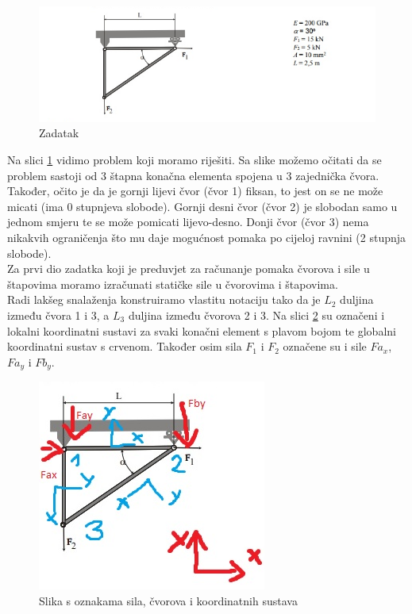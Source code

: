 \documentclass[a4paper,twoside,12pt]{memoir} %
\begin{document}
\begin{figure}[h!t]
\begin{center}
\includegraphics[scale=0.6]{pictures/chapter_fem/problem_glavas.png}
\caption{Zadatak}
\label{fig:problem__not_noted}
\end{center}
\end{figure}

Na slici \ref{fig:problem__not_noted} vidimo problem koji moramo riješiti. Sa slike možemo očitati da se problem sastoji od 3 štapna konačna elementa spojena u 3 zajednička čvora. Također, očito je da je gornji lijevi čvor (čvor 1) fiksan, to jest on se ne može micati (ima 0 stupnjeva slobode). Gornji desni čvor (čvor 2) je slobodan samo u jednom smjeru te se može pomicati lijevo-desno. Donji čvor (čvor 3) nema nikakvih ograničenja što mu daje mogućnost pomaka po cijeloj ravnini (2 stupnja slobode). \\

Za prvi dio zadatka koji je preduvjet za računanje pomaka čvorova i sile u štapovima moramo izračunati statičke sile u čvorovima i štapovima. \\
Radi lakšeg snalaženja konstruiramo vlastitu notaciju tako da je $L_2$ duljina između čvora 1 i 3, a $L_3$ duljina između čvorova 2 i 3. Na slici \ref{fig:problem_noted} su označeni i lokalni koordinatni sustavi za svaki konačni element s plavom bojom te globalni koordinatni sustav s crvenom. Također osim sila $F_1$ i $F_2$ označene su i sile $Fa_x$, $Fa_y$ i $Fb_y$.

\begin{figure}[h!t]
\begin{center}
\includegraphics[scale=0.9]{pictures/chapter_fem/problem_glavas_notacija.jpg}
\caption{Slika s oznakama sila, čvorova i koordinatnih sustava}
\label{fig:problem_noted}
\end{center}
\end{figure}
\end{document}
